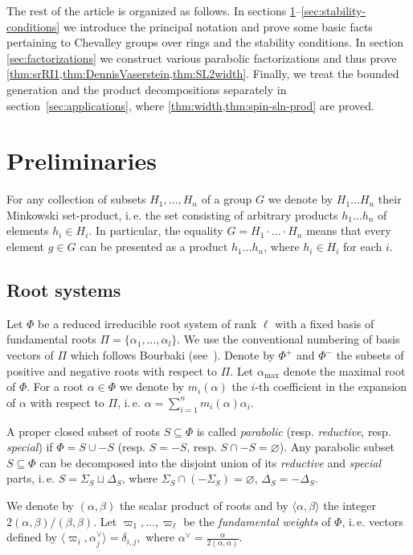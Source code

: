 \documentclass[oneside, 12pt]{amsart}
\theoremstyle{plain}
\numberwithin{equation}{section}
\numberwithin{lemma}{section}
\theoremstyle{definition}
\theoremstyle{remark}
\begin{document}
The rest of the article is organized as follows.
In sections \ref{sec:prelim}--\ref{sec:stability-conditions} we introduce the principal notation and prove some basic facts pertaining to Chevalley groups over rings and the stability conditions.
In section \ref{sec:factorizations} we construct various parabolic factorizations and thus prove \cref{thm:srRI1,thm:DennisVaserstein,thm:SL2width}.
Finally, we treat the bounded generation and the product decompositions separately in section~\ref{sec:applications}, where \cref{thm:width,thm:spin-sln-prod} are proved.

\section{Preliminaries}\label{sec:prelim}
For any collection of subsets $H_1, \ldots, H_n$ of a group $G$ we denote by $H_1\ldots H_n$ their Minkowski set-product, 
i.\,e. the set consisting of arbitrary products $h_1\ldots h_n$ of elements $h_i\in H_i$. In particular, the equality
$G = H_1\cdot\ldots\cdot H_n$ means that every element $g\in G$ can be presented as a product $h_1\ldots h_n$, where $h_i\in H_i$ for each $i$.

\subsection{Root systems}\label{sec:rootsys}
Let $\Phi$ be a reduced irreducible root system of rank $\ell$ with a fixed basis of fundamental roots $\Pi=\{\alpha_1, \ldots, \alpha_l\}$.
We use the conventional numbering of basis vectors of $\Pi$ which follows Bourbaki (see~\cite[Table~1]{PSV98}).
Denote by $\Phi^+$ and $\Phi^-$ the subsets of positive and negative roots with respect to $\Pi$.
Let $\alpha_\mathrm{max}$ denote the maximal root of $\Phi$.
For a root $\alpha\in\Phi$ we denote by $m_i(\alpha)$ the $i$-th coefficient in the expansion of $\alpha$ with respect to $\Pi$, i.\,e. $\alpha = \sum_{i=1}^n m_i(\alpha) \alpha_i$.

A proper closed subset of roots $S\subseteq \Phi$ is called {\it parabolic} (resp. {\it reductive}, resp. {\it special}) if $\Phi=S \cup -S$ (resp. $S = -S$, resp. $S \cap -S=\varnothing$).
Any parabolic subset $S \subseteq \Phi$ can be decomposed into the disjoint union of its \emph{reductive} and \emph{special} parts, i.\,e. 
$S = \Sigma_S \sqcup \Delta_S$, where $\Sigma_S \cap (-\Sigma_S) = \varnothing$, $\Delta_S = -\Delta_S$.

We denote by $(\alpha, \beta)$ the scalar product of roots and by $\langle \alpha, \beta\rangle$ the integer $2(\alpha, \beta)/(\beta, \beta)$.
Let $\varpi_1, \ldots, \varpi_\ell$ be the \emph{fundamental weights }of $\Phi$, i.\,e. vectors
defined by $\langle\varpi_i, \alpha_j^\vee\rangle=\delta_{i, j}, $ where $\alpha^\vee = \frac{\alpha}{2(\alpha, \alpha)}$.
\end{document}
